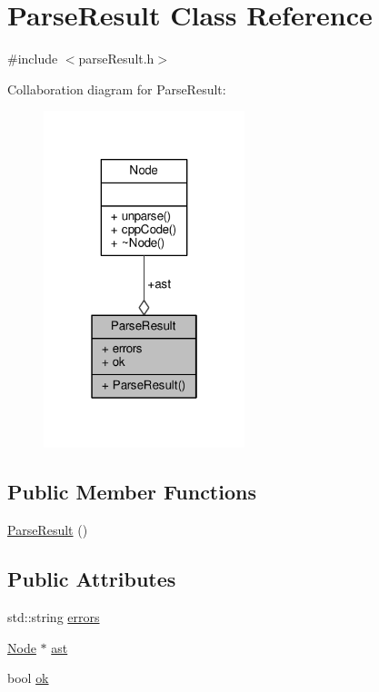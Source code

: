 \hypertarget{classParseResult}{\section{Parse\-Result Class Reference}
\label{classParseResult}
}


{\ttfamily \#include $<$parse\-Result.\-h$>$}



Collaboration diagram for Parse\-Result\-:\nopagebreak
\begin{figure}[H]
\begin{center}
\leavevmode
\includegraphics[width=166pt]{classParseResult__coll__graph}
\end{center}
\end{figure}
\subsection*{Public Member Functions}
\begin{DoxyCompactItemize}
\item 
\hyperlink{classParseResult_acd4a266f815bec59fa27f64f1923fe9e}{Parse\-Result} ()
\end{DoxyCompactItemize}
\subsection*{Public Attributes}
\begin{DoxyCompactItemize}
\item 
std\-::string \hyperlink{classParseResult_ab2dd8deb95c5177148f488ca5d31307a}{errors}
\item 
\hyperlink{classNode}{Node} $\ast$ \hyperlink{classParseResult_aa04c6ed3cba109f276e5bc089ca2ff15}{ast}
\item 
bool \hyperlink{classParseResult_a64eb6658c1fc5bbf35fdce181f6845d5}{ok}
\end{DoxyCompactItemize}


